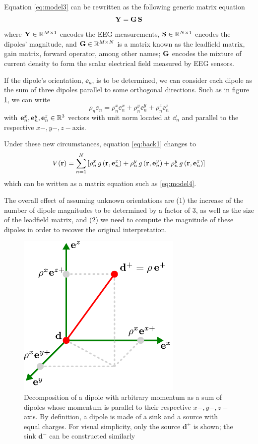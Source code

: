 Equation \eqref{eq:model3} can be rewritten as the following generic matrix equation
\begin{equation}
\mathbf{Y} = \mathbf{G}\, \mathbf{S}
\label{eq:model4}
\end{equation}
where $\mathbf{Y} \in \mathbb{R}^{M\times 1}$ encodes the EEG measurements, $\mathbf{S} \in \mathbb{R}^{N\times 1}$ encodes the dipoles' magnitude, and $\mathbf{G} \in \mathbb{R}^{M\times N}$ is a matrix known as the leadfield matrix, gain matrix, forward operator, among other names; $\mathbf{G}$ encodes the mixture of current density to form the scalar electrical field measured by EEG sensors.



If the dipole's orientation, $\ee_n$, is to be determined, we can consider each dipole as the sum of three dipoles parallel to some orthogonal directions. Such as in figure \ref{fig:diagrams3}, we can write
\begin{equation}
\rho_n \ee_n = \rho^x_n \ee_n^x + \rho_n^y \ee_n^y + \rho_n^z \ee_n^z
\end{equation}
with $\mathbf{e}_n^x, \mathbf{e}_n^y, \mathbf{e}_n^z \in \mathbb{R}^3$ vectors with unit norm located at $\dd_n$ and parallel to the respective $x-, y-, z-$axis.
%

Under these new circumstances, equation \eqref{eq:back1} changes to
\begin{equation}
V(\mathbf{r}) = 
\sum_{n=1}^N 
\left[ 
\rho_n^x\, g\left( \mathbf{r}, \mathbf{e}_n^x \right) +
\rho_n^y\, g\left( \mathbf{r}, \mathbf{e}_n^y \right) +
\rho_n^y\, g\left( \mathbf{r}, \mathbf{e}_n^z \right)
 \right]
\end{equation}
which can be written as a matrix equation such as \eqref{eq:model4}.

The overall effect of assuming unknown orientations are (1) the increase of the number of dipole magnitudes to be determined by a factor of 3, as well as the size of the leadfield matrix, and (2)
we need to compute the magnitude of these dipoles in order to recover the original interpretation.

\begin{figure}
\centering
\includegraphics[scale=1.2]{./img/OrthDecomp}
\caption{Decomposition of a dipole with arbitrary momentum as a sum of dipoles whose momentum is parallel to their respective $x-, y-, z-$axis. By definition, a dipole is made of a sink and a source with equal charges. For visual simplicity, only the source $\mathbf{d}^+$ is shown; the sink $\mathbf{d}^-$ can be constructed similarly}
\label{fig:diagrams3}
\end{figure}

